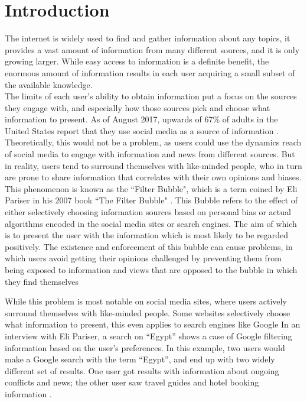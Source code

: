 \chapter{Introduction}\label{ch:intro}
The internet is widely used to find and gather information about any topics, it
provides a vast amount of information from many different sources, and it is
only growing larger. While easy access to information is a definite benefit, the
enormous amount of information results in each user acquiring a small subset of
the available knowledge.\\
The limits of each user's ability to obtain information put a focus on the
sources they engage with, and especially how those sources pick and choose what
information to present. As of August 2017, upwards of 67\% of adults in the
United States report that they use social media as a source of information
\citep{journalism2017}.
Theoretically, this would not be a problem, as users could use the dynamics
reach of social media to engage with information and news from different
sources. But in reality, users tend to surround themselves with like-minded
people, who in turn are prone to share information that correlates with their
own opinions and biases.\\

This phenomenon is known as the ``Filter Bubble", which is a term coined by Eli
Pariser in his 2007 book ``The Filter Bubble" \citep{pariser2011filter}.
This Bubble refers to the effect of either selectively choosing information
sources based on personal bias or actual algorithms encoded in the social media
sites or search engines.
The aim of which is to present the user with the information which is most
likely to be regarded positively.
The existence and enforcement of this bubble can cause problems, in which users
avoid getting their opinions challenged by preventing them from being exposed to
information and views that are opposed to the bubble in which they find
themselves 

While this problem is most notable on social media sites, where users actively
surround themselves with like-minded people. Some websites selectively choose
what information to present, this even applies to search engines like Google
\citep{filterBubbleDef} \citep{Personality} In an interview with Eli Pariser, a
search on ``Egypt'' shows a case of Google filtering information based on the
user's preferences. In this example, two users would make a Google search with
the term ``Egypt'', and end up with two widely different set of results.
One user got results with information about ongoing conflicts and news; the
other user saw travel guides and hotel booking information \citep{nusSduSearch}.